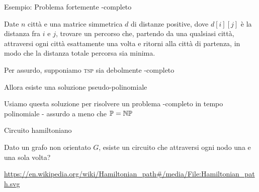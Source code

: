 \begin{frame}{Esempio:  Problema fortemente \NP-completo}

\vspace{-9pt}
\begin{myboxtitle}
Date $n$ città e una matrice simmetrica $d$ di distanze positive, dove $d[i][j]$ è la distanza fra $i$ e $j$, trovare un percorso
che, partendo da una qualsiasi città, attraversi ogni città esattamente una
volta e ritorni alla città di partenza, in modo che la distanza totale
percorsa sia minima.
\end{myboxtitle}

\begin{myboxtitle}
\BIL
\item Per assurdo, supponiamo \textsc{tsp} sia debolmente \NP-completo
\item Allora esiste una soluzione pseudo-polinomiale
\item Usiamo questa soluzione per risolvere un problema \NP-completo in
  tempo polinomiale - assurdo a meno che $\mathbb{P}=\mbox{$\mathbb{NP}$}$
\EIL
\end{myboxtitle}
\end{frame}


\begin{frame}{Circuito hamiltoniano}

\vspace{-9pt}
\begin{myboxtitle}
Dato un grafo non orientato $G$, esiste un circuito che attraversi ogni nodo
una e una sola volta?
\end{myboxtitle}

\vspace{-9pt}

\vfill
\tiny
\url{https://en.wikipedia.org/wiki/Hamiltonian\_path\#/media/File:Hamiltonian\_path.svg}

\end{frame}


